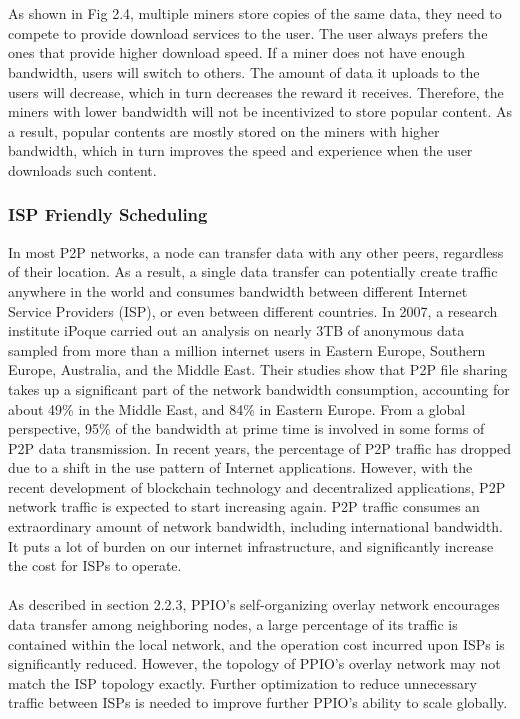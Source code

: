 \documentclass[10pt,a4paper]{article}
\begin{document}
\vspace{-1.5em}
\\ \\ As shown in Fig 2.4, multiple miners store copies of the same data, they need to compete to provide download services to the user. The user always prefers the ones that provide higher download speed. If a miner does not have enough bandwidth, users will switch to others. The amount of data it uploads to the users will decrease, which in turn decreases the reward it receives. Therefore, the miners with lower bandwidth will not be incentivized to store popular content. As a result, popular contents are mostly stored on the miners with higher bandwidth, which in turn improves the speed and experience when the user downloads such content.
\vspace{-0.5em}
\subsubsection{ISP Friendly Scheduling}  %
In most P2P networks, a node can transfer data with any other peers, regardless of their location. As a result, a single data transfer can potentially create traffic anywhere in the world and consumes bandwidth between different Internet Service Providers (ISP), or even between different countries. In 2007, a research institute iPoque carried out an analysis on nearly 3TB of anonymous data sampled from more than a million internet users in Eastern Europe, Southern Europe, Australia, and the Middle East. \cite{article26}Their studies show that P2P file sharing takes up a significant part of the network bandwidth consumption, accounting for about 49\% in the Middle East, and 84\% in Eastern Europe. From a global perspective, 95\% of the bandwidth at prime time is involved in some forms of P2P data transmission. In recent years, the percentage of P2P traffic has dropped due to a shift in the use pattern of Internet applications. However, with the recent development of blockchain technology and decentralized applications, P2P network traffic is expected to start increasing again. P2P traffic consumes an extraordinary amount of network bandwidth, including international bandwidth. It puts a lot of burden on our internet infrastructure, and significantly increase the cost for ISPs to operate.
\vspace{-0.5em}
 \\ \\As described in section 2.2.3, PPIO’s self-organizing overlay network encourages data transfer among neighboring nodes, a large percentage of its traffic is contained within the local network, and the operation cost incurred upon ISPs is significantly reduced. However, the  topology of PPIO’s overlay network may not match the ISP topology exactly. Further optimization to reduce unnecessary traffic between ISPs is needed to improve further PPIO’s ability to scale globally.
\end{document}
